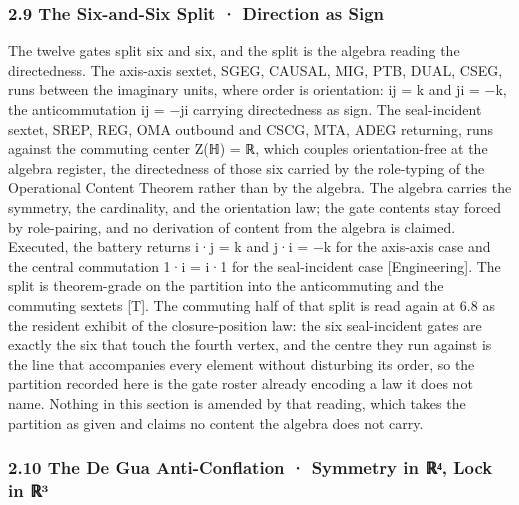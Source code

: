 \documentclass[10pt,twocolumn]{article}
\begin{document}
\hypertarget{the-six-and-six-split-direction-as-sign}{%
\subsubsection{2.9 The Six-and-Six Split · Direction as
Sign}\label{the-six-and-six-split-direction-as-sign}}

The twelve gates split six and six, and the split is the algebra reading
the directedness. The axis-axis sextet, SGEG, CAUSAL, MIG, PTB, DUAL,
CSEG, runs between the imaginary units, where order is orientation: ij =
k and ji = −k, the anticommutation ij = −ji carrying directedness as
sign. The seal-incident sextet, SREP, REG, OMA outbound and CSCG, MTA,
ADEG returning, runs against the commuting center Z(ℍ) = ℝ, which
couples orientation-free at the algebra register, the directedness of
those six carried by the role-typing of the Operational Content Theorem
rather than by the algebra. The algebra carries the symmetry, the
cardinality, and the orientation law; the gate contents stay forced by
role-pairing, and no derivation of content from the algebra is claimed.
Executed, the battery returns i·j = k and j·i = −k for the axis-axis
case and the central commutation 1·i = i·1 for the seal-incident case
{[}Engineering{]}. The split is theorem-grade on the partition into the
anticommuting and the commuting sextets {[}T{]}. The commuting half of
that split is read again at 6.8 as the resident exhibit of the
closure-position law: the six seal-incident gates are exactly the six
that touch the fourth vertex, and the centre they run against is the
line that accompanies every element without disturbing its order, so the
partition recorded here is the gate roster already encoding a law it
does not name. Nothing in this section is amended by that reading, which
takes the partition as given and claims no content the algebra does not
carry.

\hypertarget{the-de-gua-anti-conflation-symmetry-in-ux211dux2074-lock-in-ux211duxb3}{%
\subsubsection{2.10 The De Gua Anti-Conflation · Symmetry in ℝ⁴, Lock in
ℝ³}\label{the-de-gua-anti-conflation-symmetry-in-ux211dux2074-lock-in-ux211duxb3}}
\end{document}
